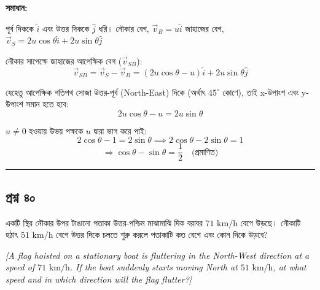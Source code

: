 \documentclass[11pt,a4paper]{article}
\begin{document}
\textbf{সমাধান:}

পূর্ব দিককে $\hat{i}$ এবং উত্তর দিককে $\hat{j}$ ধরি।
নৌকার বেগ, $\vec{v}_B = u\hat{i}$
জাহাজের বেগ, $\vec{v}_S = 2u\cos\theta\hat{i} + 2u\sin\theta\hat{j}$

নৌকার সাপেক্ষে জাহাজের আপেক্ষিক বেগ ($\vec{v}_{SB}$):
$$\vec{v}_{SB} = \vec{v}_S - \vec{v}_B = (2u\cos\theta - u)\hat{i} + 2u\sin\theta\hat{j}$$

যেহেতু আপেক্ষিক গতিপথ সোজা উত্তর-পূর্ব (North-East) দিকে (অর্থাৎ $45^\circ$ কোণে), তাই x-উপাংশ এবং y-উপাংশ সমান হতে হবে:
$$2u\cos\theta - u = 2u\sin\theta$$

$u \neq 0$ হওয়ায় উভয় পক্ষকে $u$ দ্বারা ভাগ করে পাই:
$$2\cos\theta - 1 = 2\sin\theta \implies 2\cos\theta - 2\sin\theta = 1$$
$$\Rightarrow \cos\theta - \sin\theta = \frac{1}{2} \quad \text{(প্রমাণিত)}$$

\vspace{0.5cm}
\hrule
\vspace{0.5cm}

\subsection*{প্রশ্ন ৪০}

একটি স্থির নৌকার উপর টাঙানো পতাকা উত্তর-পশ্চিম মাঝামাঝি দিক বরাবর $71\text{ km/h}$ বেগে উড়ছে। নৌকাটি হঠাৎ $51\text{ km/h}$ বেগে উত্তর দিকে চলতে শুরু করলে পতাকাটি কত বেগে এবং কোন দিকে উড়বে?

\smallskip
\textit{[A flag hoisted on a stationary boat is fluttering in the North-West direction at a speed of $71\text{ km/h}$. If the boat suddenly starts moving North at $51\text{ km/h}$, at what speed and in which direction will the flag flutter?]}

\vspace{0.3cm}
\begin{center}
\end{center}
\end{document}

